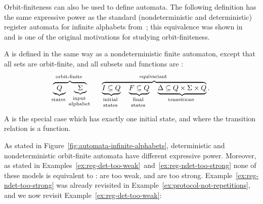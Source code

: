Orbit-finiteness can also be used to define automata. The following definition
has the same expressive power as the standard (nondeterministic and
deterministic) register automata for infinite alphabets
from~\cite{kaminskiFiniteMemoryAutomata1994}; this equivalence was shown
in~\cite[Lemma 6.3]{bojanczykAutomataTheoryNominal2014} and is one of the
original motivations for studying orbit-finiteness.

\begin{definition}
    \label{def:orbit-finite-automata}
    \AP
    A  is defined in the same way as a 
    nondeterministic finite automaton, except that all sets are orbit-finite, 
    and all subsets and functions are :
\begin{align*}
    \myoverbrace{
        \myunderbrace{Q}{states} \quad 
        \myunderbrace{\Sigma}{input \\ alphabet}
    }
    {orbit-finite}
    \qquad
    \myoverbrace{
        \myunderbrace{I \subseteq Q}{initial \\ states} \quad 
        \myunderbrace{F \subseteq Q}{final \\ states} \quad 
        \myunderbrace{\Delta \subseteq Q \times \Sigma \times Q}{transitions}
    }{equivariant}.
\end{align*}
A 
is the special case which has exactly one initial state, and where the transition relation is a function.
\end{definition}

As stated in Figure~\ref{fig:automata-infinite-alphabets}, deterministic and
nondeterministic orbit-finite automata have different expressive power.
Moreover, as stated in Examples~\ref{ex:reg-det-too-weak}~and~\ref{ex:reg-ndet-too-strong}
none of these models is equivalent to :
 are too weak, and 
 are too
strong. Example~\ref{ex:reg-ndet-too-strong} was already revisited in Example~\ref{ex:protocol-not-repetitions}, and we now revisit Example~\ref{ex:reg-det-too-weak}:  

